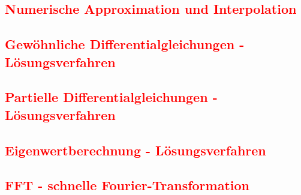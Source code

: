 	\subsection{\textcolor{red}{Numerische Approximation und Interpolation}}
	\subsection{\textcolor{red}{Gewöhnliche Differentialgleichungen - Lösungsverfahren}}
	\subsection{\textcolor{red}{Partielle Differentialgleichungen - Lösungsverfahren}}
	\subsection{\textcolor{red}{Eigenwertberechnung - Lösungsverfahren}}
	\subsection{\textcolor{red}{FFT - schnelle Fourier-Transformation}}

